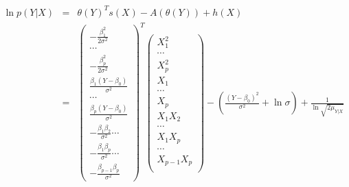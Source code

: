 \documentclass[11pt, oneside]{article}   	%
\numberwithin{figure}{section}
\numberwithin{equation}{section}
\numberwithin{table}{section}
\begin{document}
\begin{eqnarray*}
\ln p(Y|X) &=& \theta(Y)^T s(X) - A(\theta(Y)) + h(X)\\
&=&
\begin{pmatrix}
-\frac{\beta_1^2}{2\sigma^2}\\
\cdots\\
-\frac{\beta_p^2}{2\sigma^2}\\
\frac{\beta_1(Y-\beta_0)}{\sigma^2}\\
\cdots\\
\frac{\beta_p(Y-\beta_0)}{\sigma^2}\\
-\frac{\beta_1\beta_2}{\sigma^2}
\cdots\\
-\frac{\beta_1\beta_p}{\sigma^2}
\cdots\\
-\frac{\beta_{p-1}\beta_p}{\sigma^2}
\end{pmatrix}^T
\begin{pmatrix}
X_1^2\\
\cdots\\
X_p^2\\
X_1\\
\cdots\\
X_p\\
X_1 X_2\\
\cdots\\
X_1 X_p\\
\cdots\\
X_{p-1}X_{p}\\
\end{pmatrix}
- \left( \frac{(Y-\beta_0)^2}{\sigma^2} + \ln{\sigma} \right) + \frac{1}{\ln{\sqrt{2\mu_{Y|X}}}}
\end{eqnarray*}
\end{document}
